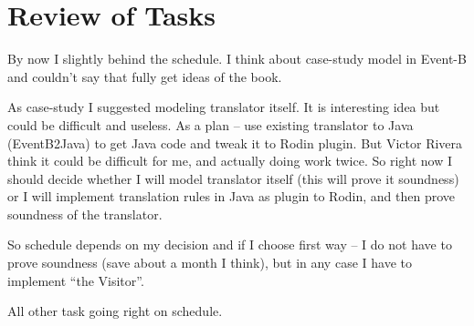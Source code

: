 \section{Review of Tasks}


By now I slightly behind the schedule. I think about case-study model
in Event-B and couldn't say that fully get ideas of the book.

As case-study I suggested modeling translator itself. It is interesting idea but
could be difficult and useless. As a plan 
 -- use existing translator to Java (EventB2Java) to get Java code and
tweak it to Rodin plugin. But Victor Rivera think it could be difficult for me,
and actually doing work twice. So right now I should decide whether I will model
translator itself (this will prove it soundness) or I will implement translation
rules in Java as plugin to Rodin, and then prove soundness of the translator.

So schedule depends on my decision and if I choose first way -- I do not have to
prove soundness (save about a month I think), but in any case I have to
implement ``the Visitor''.

All other task going right on schedule.